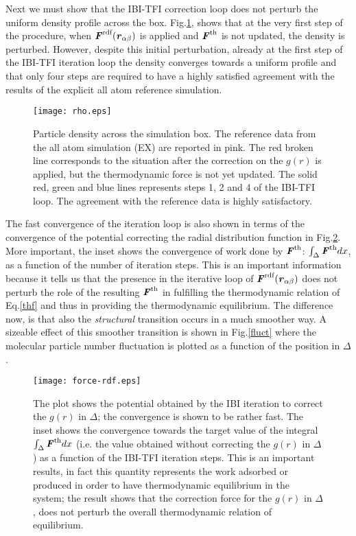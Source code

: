 \documentclass[aps,pre,preprint]{revtex4}
\renewcommand{\v}[1]{\textbf{\textit{#1}}}
\begin{document}
Next we must show that the IBI-TFI correction loop does not perturb the uniform density profile across the box. Fig.\ref{rho}, shows that at the very first step of the procedure, when $\v F^{\textrm{rdf}}(\v r_{\alpha\beta})$ is applied and ${\v F}^{\textrm{th}}$ is not updated, the density is perturbed. However, despite this initial perturbation, already at the first step of the IBI-TFI iteration loop the density converges towards a uniform profile and that only four steps are required to have a highly satisfied agreement with the results of the explicit all atom reference simulation.
\begin{figure}
  \centering
  \texttt{[image: rho.eps]}
  \caption{Particle density across the simulation box. The reference data from the all atom simulation (EX) are reported in pink. The red broken line corresponds to the situation after the correction on the $g(r)$ is applied, but the thermodynamic force is not yet updated. The solid red, green and blue lines represents steps 1, 2 and 4 of the IBI-TFI loop. The agreement with the reference data is highly satisfactory.}
  \label{rho}
\end{figure}
The fast convergence of the iteration loop is also shown in terms of the convergence of the potential correcting the radial distribution function in Fig.\ref{gpot}. More important, the inset shows the convergence of work done by ${\v F}^{\textrm{th}}$: $\int_{\Delta}{\v F}^{\textrm{th}}dx$, as a function of the number of iteration steps. This is an important information because it tells us that the presence in the iterative loop of $\v F^{\textrm{rdf}}(\v r_{\alpha\beta})$ does not perturb the role of the resulting ${\v F}^{\textrm{th}}$ in fulfilling the thermodynamic relation of Eq.\ref{thf} and thus in providing the thermodynamic equilibrium. The difference now, is that also the {\it structural} transition occurs in a much smoother way. A sizeable effect of this smoother transition is shown in Fig.\ref{fluct} where the molecular particle number fluctuation is plotted as a function of the position in $\Delta$.
\begin{figure}
  \centering
  \texttt{[image: force-rdf.eps]}
  \caption{The plot shows the potential obtained by the IBI iteration to correct the $g(r)$ in $\Delta$; the convergence is shown to be rather fast. The inset shows the convergence towards the target value of the integral $\int_{\Delta}{\v F}^{\textrm{th}}dx$ (i.e. the value obtained without correcting the $g(r)$ in $\Delta$) as a function of the IBI-TFI iteration steps. This is an important results, in fact this quantity represents the work adsorbed or produced in order to have thermodynamic equilibrium in the system; the result shows that the correction force for the $g(r)$ in $\Delta$, does not perturb the overall thermodynamic relation of equilibrium.}
  \label{gpot}
\end{figure}
\end{document}
